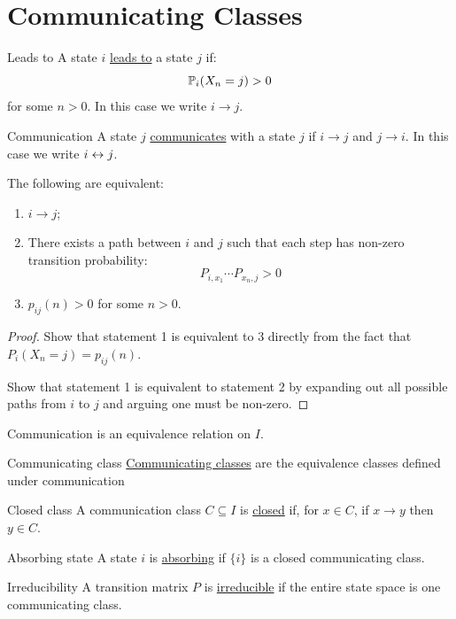 \documentclass[../Main.tex]{subfiles}
\begin{document}
\section{Communicating Classes}
\begin{definition}{Leads to}
    A state $i$ \underline{leads to} a state $j$ if:
    \begin{equation*}
        \P_i(X_n = j) > 0
    \end{equation*}
    for some $n > 0$. In this case we write $i \to j$.
\end{definition}
\begin{definition}{Communication}
    A state $j$ \underline{communicates} with a state $j$ if $i \to j$ and $j \to i$. In this case we write $i \comms j$.
\end{definition}
\begin{theorem}
    The following are equivalent:
    \begin{enumerate}
        \item $i \to j$;
        \item There exists a path between $i$ and $j$ such that each step has non-zero transition probability:
            \begin{equation*}
                P_{i, x_1} \cdots P_{x_n, j} > 0
            \end{equation*}
        \item $p_{ij}(n) > 0$ for some $n > 0$.
    \end{enumerate}
    \label{thmCommProps}
\end{theorem}
\begin{proof}
    Show that statement 1 is equivalent to 3 directly from the fact that $P_i(X_n = j) = p_{ij}(n)$.

    Show that statement 1 is equivalent to statement 2 by expanding out all possible paths from $i$ to $j$ and arguing one must be non-zero.
\end{proof}
\begin{corollary}
    Communication is an equivalence relation on $I$.
    \label{corCommIsEquiv}
\end{corollary}
\begin{definition}{Communicating class}
    \underline{Communicating classes} are the equivalence classes defined under communication
\end{definition}
\begin{definition}{Closed class}
    A communication class $C \subseteq I$ is \underline{closed} if, for $x \in C$, if $x \to y$ then $y \in C$.
\end{definition}
\begin{definition}{Absorbing state}
    A state $i$ is \underline{absorbing} if $\{i\}$ is a closed communicating class.
\end{definition}
\begin{definition}{Irreducibility}
    A transition matrix $P$ is \underline{irreducible} if the entire state space is one communicating class.
\end{definition}
\end{document}
